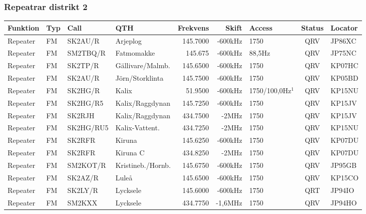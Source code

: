 \subsubsection{Repeatrar distrikt 2}

\begin{longtable}{llllrrlcl}
\textbf{Funktion}                 & \textbf{Typ}  & \textbf{Call} & \textbf{QTH}        & \textbf{Frekvens} & \textbf{Skift} & \textbf{Access}  & \textbf{Status} & \textbf{Locator} \\ \hline \endhead

Repeater & FM     & SK2AU/R   & Arjeplog           & 145.7000 & -600kHz & 1750             & QRV  & JP86XC \\
Repeater & FM     & SM2TBQ/R  & Fatmomakke         & 145.675  & -600kHz & 88,5Hz           & QRV  & JP75NC \\
Repeater & FM     & SK2TP/R   & Gällivare/Malmb.   & 145.6500 & -600kHz & 1750             & QRV  & KP07HC \\
Repeater & FM     & SK2AU/R   & Jörn/Storklinta    & 145.7500 & -600kHz & 1750             & QRV  & KP05BD \\
Repeater & FM     & SK2HG/R   & Kalix              & 51.9500  & -600kHz & 1750/100,0Hz$^1$ & QRV  & KP15NU \\
Repeater & FM     & SK2HG/R5  & Kalix/Raggdynan    & 145.7250 & -600kHz & 1750             & QRV  & KP15JV \\
Repeater & FM     & SK2RJH    & Kalix/Raggdynan    & 434.7500 & -2MHz   & 1750             & QRV  & KP15JV \\
Repeater & FM     & SK2HG/RU5 & Kalix-Vattent.     & 434.7250 & -2MHz   & 1750             & QRV  & KP15NU \\
Repeater & FM     & SK2RFR    & Kiruna             & 145.6250 & -600kHz & 1750             & QRV  & KP07DU \\
Repeater & FM     & SK2RFR    & Kiruna C           & 434.8250 & -2MHz   & 1750             & QRV  & KP07DU \\
Repeater & FM     & SM2KOT/R  & Kristineb./Hornb.  & 145.6750 & -600kHz & 1750             & QRV  & JP95GB \\
Repeater & FM     & SK2AZ/R   & Luleå              & 145.6500 & -600kHz & 1750             & QRV  & KP15CO \\
Repeater & FM     & SK2LY/R   & Lycksele           & 145.6000 & -600kHz & 1750             & QRT  & JP94IO \\
Repeater & FM     & SM2KXX    & Lycksele           & 434.7750 & -1,6MHz & 1750             & QRV  & JP94HO \\

\end{longtable}
